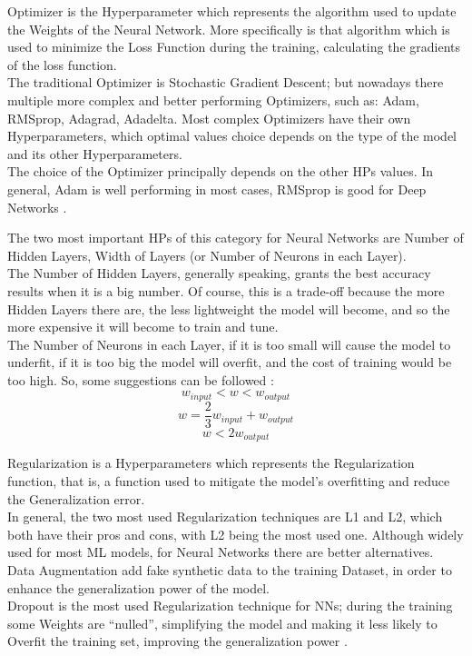 Optimizer is the Hyperparameter which represents the algorithm used to update the Weights of the Neural Network.
More specifically is that algorithm which is used to minimize the Loss Function during the training, calculating the gradients of the loss function.
\\[0.3cm]The traditional Optimizer is Stochastic Gradient Descent; but nowadays there multiple more complex and better performing Optimizers, such as: Adam, RMSprop, Adagrad, Adadelta.
Most complex Optimizers have their own Hyperparameters, which optimal values choice depends on the type of the model and its other Hyperparameters.
\\[0.3cm]The choice of the Optimizer principally depends on the other HPs values. In general, Adam is well performing in most cases, RMSprop is good for Deep Networks \cite{Tesi-1.9}.

The two most important HPs of this category for Neural Networks are Number of Hidden Layers, Width of Layers (or Number of Neurons in each Layer).
\\[0.3cm]The Number of Hidden Layers, generally speaking, grants the best accuracy results when it is a big number. Of course, this is a trade-off because the more Hidden Layers there are, the less lightweight the model will become, and so the more expensive it will become to train and tune.
\\[0.3cm]The Number of Neurons in each Layer, if it is too small will cause the model to underfit, if it is too big the model will overfit, and the cost of training would be too high. So, some suggestions can be followed \cite{Tesi-1.9}:
\begin{equation}
	w_{input} < w < w_{output}
\end{equation}
\begin{equation}
	w = \frac{2}{3} w_{input} + w_{output}
\end{equation}
\begin{equation}
	w < 2 w_{output}
\end{equation}

Regularization is a Hyperparameters which represents the Regularization function, that is, a function used to mitigate the model's overfitting and reduce the Generalization error.
\\[0.3cm]In general, the two most used Regularization techniques are L1 and L2, which both have their pros and cons, with L2 being the most used one. Although widely used for most ML models, for Neural Networks there are better alternatives.
\\[0.3cm]Data Augmentation add fake synthetic data to the training Dataset, in order to enhance the generalization power of the model.
\\[0.3cm]Dropout is the most used Regularization technique for NNs; during the training some Weights are “nulled”, simplifying the model and making it less likely to Overfit the training set, improving the generalization power \cite{Tesi-1.9}.


